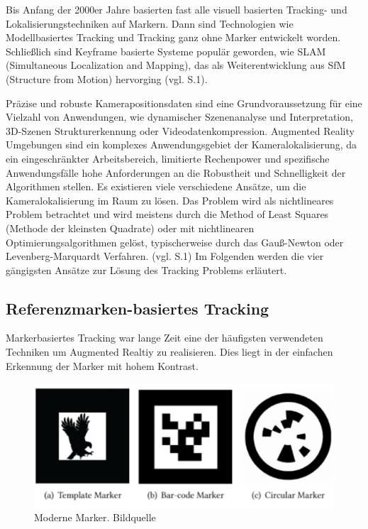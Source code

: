 Bis Anfang der 2000er Jahre basierten fast alle visuell basierten Tracking- und Lokalisierungstechniken auf Markern. Dann sind Technologien wie Modellbasiertes Tracking und Tracking ganz ohne Marker entwickelt worden. Schließlich sind Keyframe basierte Systeme populär geworden, wie SLAM (Simultaneous Localization and Mapping), das als Weiterentwicklung aus SfM (Structure from Motion) hervorging (vgl. \cite{pose_estimation} S.1).

Präzise und robuste Kamerapositionsdaten sind eine Grundvoraussetzung für eine Vielzahl von Anwendungen, wie dynamischer Szenenanalyse und Interpretation, 3D-Szenen Strukturerkennung oder Videodatenkompression. Augmented Reality Umgebungen sind ein komplexes Anwendungsgebiet der Kameralokalisierung, da ein eingeschränkter Arbeitsbereich, limitierte Rechenpower und spezifische Anwendungsfälle hohe Anforderungen an die Robustheit und Schnelligkeit der Algorithmen stellen. 
Es existieren viele verschiedene Ansätze, um die Kameralokalisierung im Raum zu lösen. Das Problem wird als nichtlineares Problem betrachtet und wird meistens durch die \glqq Method of Least Squares\grqq{} (Methode der kleinsten Quadrate) oder  mit nichtlinearen Optimierungsalgorithmen gelöst, typischerweise durch das Gauß-Newton oder Levenberg-Marquardt Verfahren. (vgl. \cite{camera_pose} S.1) Im Folgenden werden die vier gängigsten Ansätze zur Lösung des Tracking Problems erläutert. 


\subsection{Referenzmarken-basiertes Tracking}

Markerbasiertes Tracking war lange Zeit eine der häufigsten verwendeten Techniken um Augmented Realtiy zu realisieren. Dies liegt in der einfachen Erkennung der Marker mit hohem Kontrast.

\begin{figure}[H]
	\centering
	\includegraphics[scale=0.6]{markers.png}
	\caption{Moderne Marker. Bildquelle \cite{markers}}
\end{figure} 

